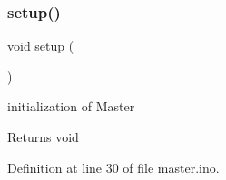 \mbox{\label{master_8ino_a4fc01d736fe50cf5b977f755b675f11d}} 
\subsubsection{\texorpdfstring{setup()}{setup()}}
{\footnotesize\ttfamily void setup (\begin{DoxyParamCaption}{ }\end{DoxyParamCaption})}



initialization of Master 

\begin{DoxyReturn}{Returns}
void 
\end{DoxyReturn}


Definition at line 30 of file master.\+ino.

